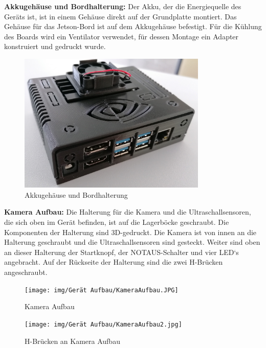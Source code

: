 \textbf{Akkugehäuse und Bordhalterung:} Der Akku, der die Energiequelle des Geräts ist, ist in einem Gehäuse direkt auf der Grundplatte montiert. Das Gehäuse für das Jetson-Bord ist auf dem Akkugehäuse befestigt. Für die Kühlung des Boards wird ein Ventilator verwendet, für dessen Montage ein Adapter konstruiert und gedruckt wurde.

\begin{figure}[H]
  \includegraphics[width=0.8\textwidth]{img/Gerät Aufbau/Gehäuse_Jetson_2.jpeg.jpg}
  \centering
  \caption{Akkugehäuse und Bordhalterung}
  \label{fig:Akkugehäuse und Bordhalterung}
\end{figure}

\newpage

\textbf{Kamera Aufbau:} Die Halterung für die Kamera und die Ultraschallsensoren, die sich oben im Gerät befinden, ist auf die Lagerböcke geschraubt. Die Komponenten der Halterung sind 3D-gedruckt. Die Kamera ist von innen an die Halterung geschraubt und die Ultraschallsensoren sind gesteckt. Weiter sind oben an dieser Halterung der Startknopf, der NOTAUS-Schalter und vier LED`s angebracht. Auf der Rückseite der Halterung sind die zwei H-Brücken angeschraubt.

\begin{figure}[H]
  \texttt{[image: img/Gerät Aufbau/KameraAufbau.JPG]}
  \centering
  \caption{Kamera Aufbau}
  \label{fig:Kameraturnseite}
\end{figure}

\begin{figure}[H]
  \texttt{[image: img/Gerät Aufbau/KameraAufbau2.jpg]}
  \centering
  \caption{H-Brücken an Kamera Aufbau}
  \label{fig:Kameraturmoben}
\end{figure}

\newpage


